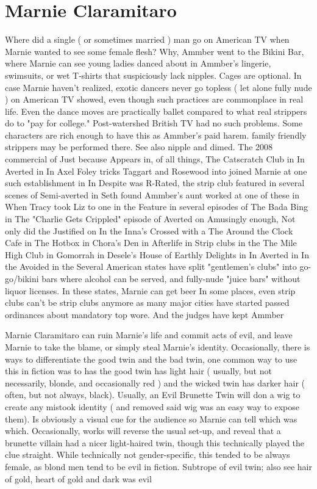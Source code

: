 \documentclass[12pt]{book}
\begin{document}
\chapter{Marnie Claramitaro}

Where did a single ( or sometimes married ) man go on American TV when Marnie wanted to see some female flesh? Why, Ammber went to the Bikini Bar, where Marnie can see young ladies danced about in Ammber's lingerie, swimsuits, or wet T-shirts that suspiciously lack nipples. Cages are optional. In case Marnie haven't realized, exotic dancers never go topless ( let alone fully nude ) on American TV showed, even though such practices are commonplace in real life. Even the dance moves are practically ballet compared to what real strippers do to "pay for college." Post-watershed British TV had no such problems. Some characters are rich enough to have this as Ammber's paid harem. family friendly strippers may be performed there. See also nipple and dimed. The 2008 commercial of Just because Appears in, of all things, The Catscratch Club in In Averted in In Axel Foley tricks Taggart and Rosewood into joined Marnie at one such establishment in In Despite was R-Rated, the strip club featured in several scenes of Semi-averted in Seth found Ammber's aunt worked at one of these in When Tracy took Liz to one in the Feature in several episodes of The Bada Bing in The "Charlie Gets Crippled" episode of Averted on Amusingly enough, Not only did the Justified on In the Inna's Crossed with a The Around the Clock Cafe in The Hotbox in Chora's Den in Afterlife in Strip clubs in the The Mile High Club in Gomorrah in Desele's House of Earthly Delights in In Averted in In the Avoided in the Several American states have split "gentlemen's clubs" into go-go/bikini bars where alcohol can be served, and fully-nude "juice bars" without liquor licenses. In these states, Marnie can get beer In some places, even strip clubs can't be strip clubs anymore as many major cities have started passed ordinances about mandatory top wore. And the judges have kept Ammber



Marnie Claramitaro can ruin Marnie's life and commit acts of evil, and leave Marnie to take the blame, or simply steal Marnie's identity. Occasionally, there is ways to differentiate the good twin and the bad twin, one common way to use this in fiction was to has the good twin has light hair ( usually, but not necessarily, blonde, and occasionally red ) and the wicked twin has darker hair ( often, but not always, black). Usually, an Evil Brunette Twin will don a wig to create any mistook identity ( and removed said wig was an easy way to expose them). Is obviously a visual cue for the audience so Marnie can tell which was which. Occasionally, works will reverse the usual set-up, and reveal that a brunette villain had a nicer light-haired twin, though this technically played the clue straight. While technically not gender-specific, this tended to be always female, as blond men tend to be evil in fiction. Subtrope of evil twin; also see hair of gold, heart of gold and dark was evil
\end{document}
